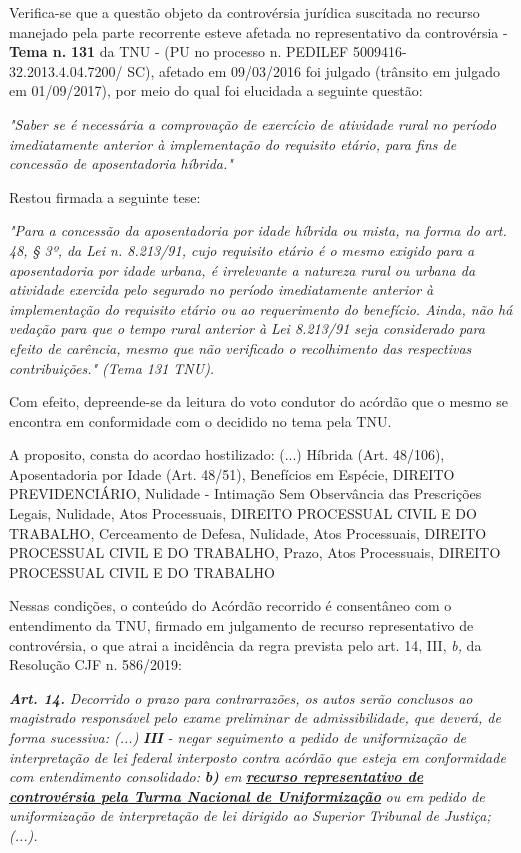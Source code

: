 \documentclass[12pt]{article}
\begin{document}
\justifying
\noindent Verifica-se que a questão objeto da controvérsia jurídica suscitada no recurso manejado pela parte recorrente esteve afetada no representativo da controvérsia - \textbf{Tema n. }\textbf{131} da TNU - (PU no processo n. PEDILEF 5009416-32.2013.4.04.7200/ SC),  afetado em 09/03/2016 foi julgado (trânsito em julgado em 01/09/2017), por meio do qual foi elucidada a seguinte questão:

\noindent \textit{"Saber se é necessária a comprovação de exercício de atividade rural no período imediatamente anterior à implementação do requisito etário, para fins de concessão de aposentadoria híbrida."}

\noindent Restou firmada a seguinte tese:

\noindent \textit{"Para a concessão da aposentadoria por idade híbrida ou mista, na forma do art. 48, § 3º, da Lei n. 8.213/91, cujo requisito etário é o mesmo exigido para a aposentadoria por idade urbana, é irrelevante a natureza rural ou urbana da atividade exercida pelo segurado no período imediatamente anterior à implementação do requisito etário ou ao requerimento do benefício. Ainda, não há vedação para que o tempo rural anterior à Lei 8.213/91 seja considerado para efeito de carência, mesmo que não verificado o recolhimento das respectivas contribuições." (Tema 131 TNU).}

\noindent Com efeito, depreende-se da leitura do voto condutor do acórdão que o mesmo se encontra em conformidade com o decidido no  tema pela TNU.

\noindent A proposito, consta do acordao hostilizado: (...) Híbrida (Art. 48/106), Aposentadoria por Idade (Art. 48/51), Benefícios em Espécie, DIREITO PREVIDENCIÁRIO, Nulidade - Intimação Sem Observância das Prescrições Legais, Nulidade, Atos Processuais, DIREITO PROCESSUAL CIVIL E DO TRABALHO, Cerceamento de Defesa, Nulidade, Atos Processuais, DIREITO PROCESSUAL CIVIL E DO TRABALHO, Prazo, Atos Processuais, DIREITO PROCESSUAL CIVIL E DO TRABALHO

\noindent Nessas condições, o conteúdo do Acórdão recorrido é consentâneo com o entendimento da TNU, firmado em julgamento de recurso representativo de controvérsia, o que atrai a incidência da regra prevista pelo art. 14, III, \textit{b,} da Resolução CJF n. 586/2019:

\noindent \textit{\textbf{Art. 14.}}\textit{ Decorrido o prazo para contrarrazões, os autos serão conclusos ao magistrado responsável pelo exame preliminar de admissibilidade, que deverá, de forma sucessiva: (...) }\textit{\textbf{III }}\textit{- negar seguimento a pedido de uniformização de interpretação de lei federal interposto contra acórdão que esteja em conformidade com entendimento consolidado: }\textit{\textbf{b)}}\textit{ em }\uline{\textit{\textbf{recurso representativo de controvérsia pela Turma Nacional de Uniformização}}}\textit{ ou em pedido de uniformização de interpretação de lei dirigido ao Superior Tribunal de Justiça;(...).}
\end{document}
